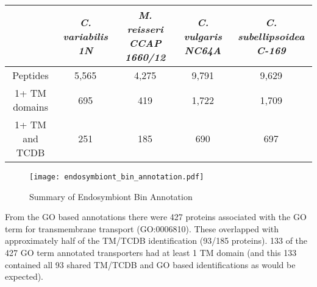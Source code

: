 \begin{table}
    \centering
    \begin{tabular}{|c|c|c|c|c|}
        \hline
        & \textit{C. variabilis 1N} & \textit{M. reisseri CCAP 1660/12} & \textit{C. vulgaris NC64A} & \textit{C. subellipsoidea C-169} \\
        \hline
        Peptides        & 5,565 & 4,275 & 9,791 & 9,629 \\
        1+ TM domains   &   695 &   419 & 1,722 & 1,709 \\
        1+ TM and TCDB  &   251 &   185 &   690 &   697 \\
        \hline
    \end{tabular}
\end{table}




\begin{figure}
    \centering
    \texttt{[image: endosymbiont\_bin\_annotation.pdf]}
    \caption[Summary of \textit{M. reisseri} Endosymbiont Bin Annotation]{Summary
    of Endosymbiont Bin Annotation} 
\end{figure}







From the GO based annotations there were 427 proteins associated
with the GO term for transmembrane transport (GO:0006810).
These overlapped with approximately half of the TM/TCDB identification 
(93/185 proteins).  133 of the 427 GO term annotated transporters
had at least 1 TM domain (and this 133 contained all 93 shared TM/TCDB and GO 
based identifications as would be expected). 

